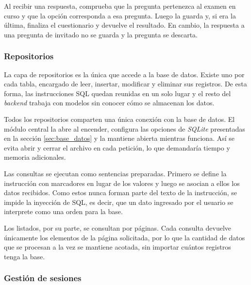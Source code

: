Al recibir una respuesta, comprueba que la pregunta pertenezca al examen en curso y que la opción corresponda a esa pregunta. Luego la guarda y, si era la última, finaliza el cuestionario y devuelve el resultado. En cambio, la respuesta a una pregunta de invitado no se guarda y la pregunta se descarta.

\subsubsection{Repositorios}

La capa de repositorios es la única que accede a la base de datos. Existe uno por cada tabla, encargado de leer, insertar, modificar y eliminar sus registros. De esta forma, las instrucciones SQL quedan reunidas en un solo lugar y el resto del \emph{backend} trabaja con modelos sin conocer cómo se almacenan los datos.

Todos los repositorios comparten una única conexión con la base de datos. El módulo central la abre al encender, configura las opciones de \emph{SQLite} presentadas en la sección \ref{sec:base_datos} y la mantiene abierta mientras funciona. Así se evita abrir y cerrar el archivo en cada petición, lo que demandaría tiempo y memoria adicionales.

Las consultas se ejecutan como sentencias preparadas. Primero se define la instrucción con marcadores en lugar de los valores y luego se asocian a ellos los datos recibidos. Como estos nunca forman parte del texto de la instrucción, se impide la inyección de SQL, es decir, que un dato ingresado por el usuario se interprete como una orden para la base.

Los listados, por su parte, se consultan por páginas. Cada consulta devuelve únicamente los elementos de la página solicitada, por lo que la cantidad de datos que se procesan a la vez se mantiene acotada, sin importar cuántos registros tenga la base.


\subsubsection{Gestión de sesiones}

